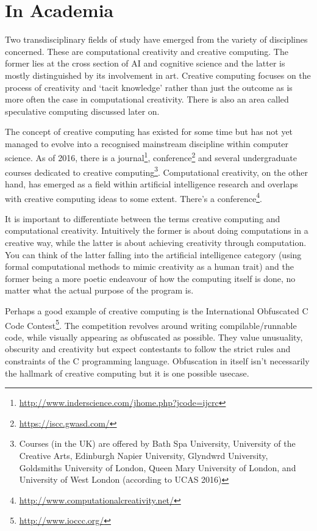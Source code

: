 \section{In Academia}

Two transdisciplinary fields of study have emerged from the variety of disciplines concerned. These are computational creativity and creative computing. The former lies at the cross section of \ac{AI} and cognitive science and the latter is mostly distinguished by its involvement in art. Creative computing focuses on the process of creativity and `tacit knowledge' rather than just the outcome as is more often the case in computational creativity. There is also an area called speculative computing discussed later on.

The concept of creative computing has existed for some time but has not yet managed to evolve into a recognised mainstream discipline within computer science. As of 2016, there is a journal\footnote{\url{http://www.inderscience.com/jhome.php?jcode=ijcrc}}, conference\footnote{\url{https://iscc.gwasd.com/}} and several undergraduate courses dedicated to creative computing\footnote{Courses (in the UK) are offered by Bath Spa University, University of the Creative Arts, Edinburgh Napier University, Glyndwrd University, Goldsmiths University of London, Queen Mary University of London, and University of West London (according to UCAS 2016)}. Computational creativity, on the other hand, has emerged as a field within artificial intelligence research and overlaps with creative computing ideas to some extent. There's a conference\footnote{\url{http://www.computationalcreativity.net/}}.

It is important to differentiate between the terms creative computing and computational creativity. Intuitively the former is about doing computations in a creative way, while the latter is about achieving creativity through computation. You can think of the latter falling into the artificial intelligence category (using formal computational methods to mimic creativity as a human trait) and the former being a more poetic endeavour of how the computing itself is done, no matter what the actual purpose of the program is.

Perhaps a good example of creative computing is the International Obfuscated C Code Contest\footnote{\url{http://www.ioccc.org/}}. The competition revolves around writing compilable/runnable code, while visually appearing as obfuscated as possible. They value unusuality, obscurity and creativity but expect contestants to follow the strict rules and constraints of the C programming language. Obfuscation in itself isn't necessarily the hallmark of creative computing but it is one possible usecase.

